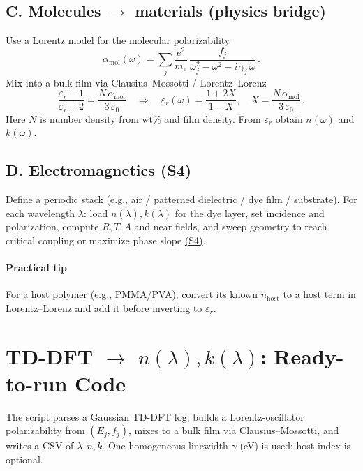 \documentclass[11pt,a4paper]{article}
\begin{document}
\subsection*{C. Molecules $\rightarrow$ materials (physics bridge)}
Use a Lorentz model for the molecular polarizability
\begin{equation}
\alpha_{\mathrm{mol}}(\omega) = \sum_j \frac{e^2}{m_e}\,\frac{f_j}{\omega_j^2 - \omega^2 - i\,\gamma_j\,\omega}\,.
\end{equation}
Mix into a bulk film via Clausius--Mossotti / Lorentz--Lorenz
\begin{equation}
\frac{\varepsilon_r-1}{\varepsilon_r+2} = \frac{N\,\alpha_{\mathrm{mol}}}{3\,\varepsilon_0}
\quad\Rightarrow\quad
\varepsilon_r(\omega) = \frac{1+2X}{1-X},\quad X=\frac{N\,\alpha_{\mathrm{mol}}}{3\,\varepsilon_0}\,.
\end{equation}
Here $N$ is number density from wt\% and film density. From $\varepsilon_r$ obtain $n(\omega)$ and $k(\omega)$.

\subsection*{D. Electromagnetics (S4)}
Define a periodic stack (e.g., air / patterned dielectric / dye film / substrate). For each wavelength $\lambda$: load $n(\lambda),k(\lambda)$ for the dye layer, set incidence and polarization, compute $R,T,A$ and near fields, and sweep geometry to reach critical coupling or maximize phase slope \href{https://web.stanford.edu/group/fan/publication/Liu_ComputerPhysicsCommunications_183_2233_2012.pdf}{(S4)}.

\paragraph{Practical tip} For a host polymer (e.g., PMMA/PVA), convert its known $n_{\mathrm{host}}$ to a host term in Lorentz--Lorenz and add it before inverting to $\varepsilon_r$.

\section{TD-DFT $\rightarrow$ $n(\lambda),k(\lambda)$: Ready-to-run Code}

The script parses a Gaussian TD-DFT log, builds a Lorentz-oscillator polarizability from $(E_j,f_j)$, mixes to a bulk film via Clausius--Mossotti, and writes a CSV of $\lambda, n, k$. One homogeneous linewidth $\gamma$ (eV) is used; host index is optional.
\end{document}
